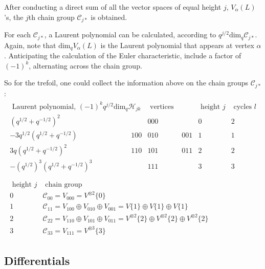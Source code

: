 \documentclass[a4paper,titlepage,twoside]{book}
\begin{document}
After conducting a direct sum of all the vector spaces of equal height $j$, $V_{\alpha}{(L)}$'s, the $j$th chain group $\mathcal{C}_{j*}$ is obtained.  

For each $\mathcal{C}_{j*}$, a Laurent polynomial can be calculated, according to $q^{j/2} \text{dim}_q{ \mathcal{C}_{j*} }$.  Again, note that $\text{dim}_q{V_{\alpha}{(L)}}$ is the Laurent polynomial that appears at vertex $\alpha$.  Anticipating the calculation of the Euler characteristic, include a factor of $(-1)^k$, alternating across the chain group.

So for the trefoil, one could collect the information above on the chain groups $\mathcal{C}_{j*}$:
\begin{equation}
\begin{gathered}
  \begin{matrix}
\text{ Laurent polynomial, } (-1)^k q^{j/2} \text{dim}_q{ \mathcal{H}_{jk}}  &      & \text{ vertices } &  & \text{ height } j  & \text{ cycles } l \\ 
   (q^{1/2} + q^{-1/2})^2   &  & 000 &  &  0    & 2 \\
   -3 q^{1/2}(q^{1/2} + q^{-1/2})   & 100   & 010 & 001   &  1 & 1 \\
   3 q (q^{1/2} + q^{-1/2})^2   & 110   & 101 & 011   & 2  & 2 \\
   -(q^{1/2})^3 (q^{1/2} + q^{-1/2})^3  & & 111 &  & 3 & 3
\end{matrix} \\
\quad \\
\begin{matrix}
\text{ height } j & \text{ chain group } & \\ 
 0 & \mathcal{C}_{00} = V_{000} = V^{ \otimes 2}{ \lbrace 0 \rbrace } & \\
1  & \mathcal{C}_{11} = V_{100} \oplus V_{010} \oplus V_{001} = V{ \lbrace 1 \rbrace } \oplus V{ \lbrace 1 \rbrace } \oplus V{ \lbrace 1 \rbrace } & \\
2  & \mathcal{C}_{22} = V_{110} \oplus V_{101} \oplus V_{011} = V^{ \otimes 2}{ \lbrace 2 \rbrace } \oplus V^{ \otimes 2}{ \lbrace 2 \rbrace } \oplus V^{ \otimes 2}{ \lbrace 2 \rbrace } & \\ 
3 & \mathcal{C}_{33} = V_{111} = V^{ \otimes 3}{ \lbrace 3 \rbrace } & 
\end{matrix}
\end{gathered} \label{Eq:trefoilKhovanovviaBarNatan00}
\end{equation}


\subsection{Differentials}
\end{document}
